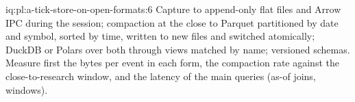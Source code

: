 \begin{solution}{iq:pl:a-tick-store-on-open-formats:6}
Capture to append-only flat files and Arrow IPC during the session; compaction at the close to Parquet partitioned by date and
symbol, sorted by time, written to new files and switched atomically; DuckDB or Polars over both through views matched by name;
versioned schemas. Measure first the bytes per event in each form, the compaction rate against the close-to-research window, and
the latency of the main queries (as-of joins, windows).
\end{solution}
